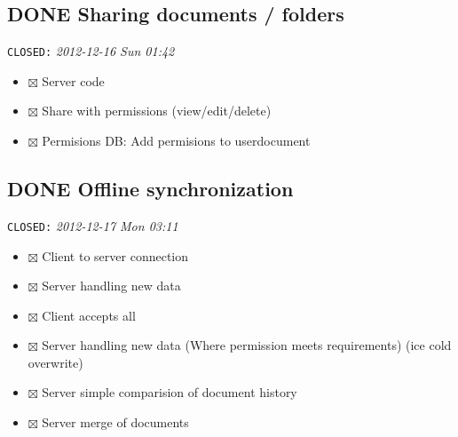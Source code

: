 \documentclass[11pt]{article}
\begin{document}
\subsection{\textbf{DONE} Sharing documents / folders}
\label{sec-2-9}

   \texttt{CLOSED:} \textit{2012-12-16 Sun 01:42}

\begin{itemize}
\item $\boxtimes$ Server code
\item $\boxtimes$ Share with permissions (view/edit/delete)
\item $\boxtimes$ Permisions DB: Add permisions to userdocument
\end{itemize}
\subsection{\textbf{DONE} Offline synchronization}
\label{sec-2-10}

   \texttt{CLOSED:} \textit{2012-12-17 Mon 03:11}

\begin{itemize}
\item $\boxtimes$ Client to server connection
\item $\boxtimes$ Server handling new data
\item $\boxtimes$ Client accepts all
\item $\boxtimes$ Server handling new data (Where permission meets requirements) (ice cold overwrite)
\item $\boxtimes$ Server simple comparision of document history
\item $\boxtimes$ Server merge of documents
\end{itemize}
\end{document}
